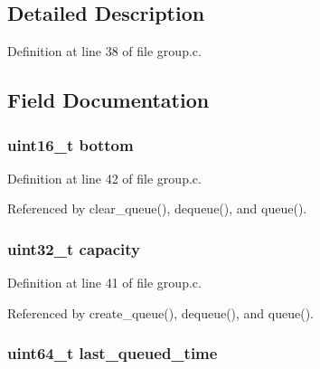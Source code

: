 \subsection{Detailed Description}


Definition at line 38 of file group.\+c.



\subsection{Field Documentation}
\hypertarget{struct_group___jitter_buffer_a12c8099ac87952580dd090215e02728c}{
\subsubsection[{bottom}]{\setlength{\rightskip}{0pt plus 5cm}uint16\+\_\+t bottom}}\label{struct_group___jitter_buffer_a12c8099ac87952580dd090215e02728c}


Definition at line 42 of file group.\+c.



Referenced by clear\+\_\+queue(), dequeue(), and queue().

\hypertarget{struct_group___jitter_buffer_a391c992c66c3e5540265a85ec2b9216a}{
\subsubsection[{capacity}]{\setlength{\rightskip}{0pt plus 5cm}uint32\+\_\+t capacity}}\label{struct_group___jitter_buffer_a391c992c66c3e5540265a85ec2b9216a}


Definition at line 41 of file group.\+c.



Referenced by create\+\_\+queue(), dequeue(), and queue().

\hypertarget{struct_group___jitter_buffer_abec0d4ef82ac14ce49e34eff86392f02}{
\subsubsection[{last\+\_\+queued\+\_\+time}]{\setlength{\rightskip}{0pt plus 5cm}uint64\+\_\+t last\+\_\+queued\+\_\+time}}\label{struct_group___jitter_buffer_abec0d4ef82ac14ce49e34eff86392f02}


